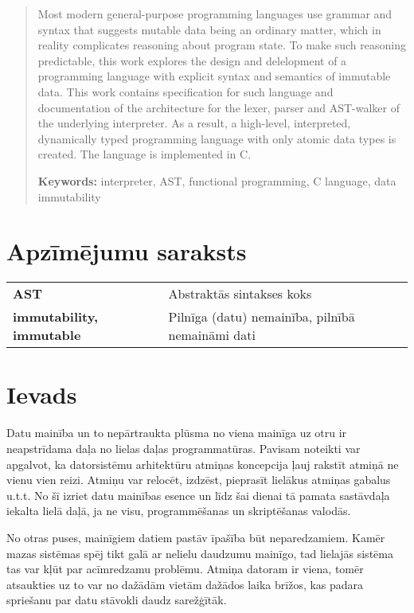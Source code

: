 \documentclass[12pt,a4paper]{report}
\begin{document}
\begin{abstract}
    Most modern general-purpose programming languages use grammar and syntax that suggests mutable data being an ordinary matter, which in reality complicates reasoning about program state.
    To make such reasoning predictable, this work explores the design and delelopment of a programming language with explicit syntax and semantics of immutable data. 
    This work contains specification for such language and documentation of the architecture for the lexer, parser and AST-walker of the underlying interpreter.
    As a result, a high-level, interpreted, dynamically typed programming language with only atomic data types is created. The language is implemented in C.

    \begin{flushleft}
    \textbf{Keywords:} interpreter, AST, functional programming, C language, data immutability
    \end{flushleft}
\end{abstract} 

\tableofcontents

\newpage
\chapter*{Apzīmējumu saraksts}


\begin{tabular}{ll} 
\textbf{AST} & Abstraktās sintakses koks \\
\textbf{immutability, immutable} & Pilnīga (datu) nemainība, pilnībā nemaināmi dati
\end{tabular}


\newpage
\chapter*{Ievads}

Datu mainība un to nepārtraukta plūsma no viena mainīga uz otru ir neapstrīdama daļa no lielas daļas programmatūras. Pavisam noteikti var apgalvot, ka datorsistēmu arhitektūru atmiņas koncepcija ļauj rakstīt atmiņā ne vienu vien reizi. Atmiņu var relocēt, izdzēst, pieprasīt lielākus atmiņas gabalus u.t.t. No šī izriet datu mainības esence un līdz šai dienai tā pamata sastāvdaļa iekalta lielā daļā, ja ne visu, programmēšanas un skriptēšanas valodās.   

No otras puses, mainīgiem datiem pastāv īpašība būt neparedzamiem. Kamēr mazas sistēmas spēj tikt galā ar nelielu daudzumu mainīgo, tad lielajās sistēma tas var kļūt par acīmredzamu problēmu. Atmiņa datoram ir viena, tomēr atsaukties uz to var no dažādām vietām dažādos laika brīžos, kas padara spriešanu par datu stāvokli daudz sarežģītāk.  
\end{document}
